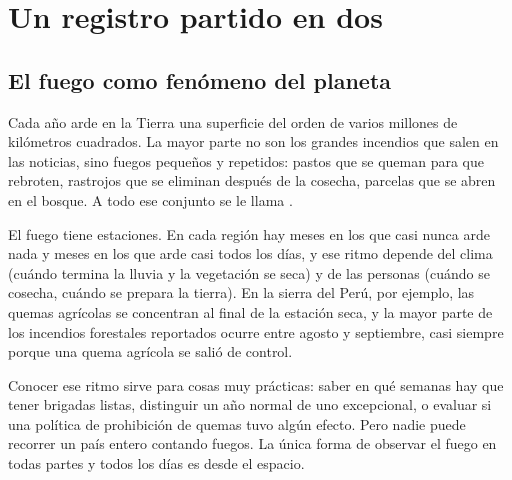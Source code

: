 \chapter{Un registro partido en dos}\label{cap:problema}


\section{El fuego como fenómeno del planeta}

Cada año arde en la Tierra una superficie del orden de varios millones de kilómetros
cuadrados. La mayor parte no son los grandes incendios que salen en las noticias, sino fuegos
pequeños y repetidos: pastos que se queman para que rebroten, rastrojos que se eliminan después
de la cosecha, parcelas que se abren en el bosque. A todo ese conjunto se le llama
.

El fuego tiene estaciones. En cada región hay meses en los que casi nunca arde nada y meses en
los que arde casi todos los días, y ese ritmo depende del clima (cuándo termina la lluvia y la
vegetación se seca) y de las personas (cuándo se cosecha, cuándo se prepara la tierra). En la
sierra del Perú, por ejemplo, las quemas agrícolas se concentran al final de la estación seca,
y la mayor parte de los incendios forestales reportados ocurre entre agosto y septiembre, casi
siempre porque una quema agrícola se salió de control.

Conocer ese ritmo sirve para cosas muy prácticas: saber en qué semanas hay que tener brigadas
listas, distinguir un año normal de uno excepcional, o evaluar si una política de prohibición
de quemas tuvo algún efecto. Pero nadie puede recorrer un país entero contando fuegos. La única
forma de observar el fuego en todas partes y todos los días es desde el espacio.

